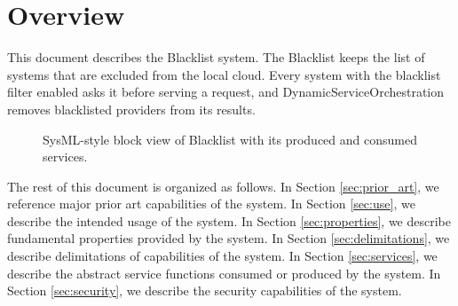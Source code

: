 \documentclass[a4paper]{arrowhead}
\begin{document}
\section{Overview}
\label{sec:overview}

This document describes the Blacklist system. The Blacklist keeps the list of systems that are excluded from the local cloud. Every system with the blacklist filter enabled asks it before serving a request, and Dynamic\allowbreak{}Service\allowbreak{}Orchestration removes blacklisted providers from its results.

\begin{figure}[ht!]
  \centering
  \caption{SysML-style block view of Blacklist with its produced and consumed services.}
  \label{fig:system}
\end{figure}

The rest of this document is organized as follows.
In Section \ref{sec:prior_art}, we reference major prior art capabilities of the system.
In Section \ref{sec:use}, we describe the intended usage of the system.
In Section \ref{sec:properties}, we describe fundamental properties provided by the system.
In Section \ref{sec:delimitations}, we describe delimitations of capabilities of the system.
In Section \ref{sec:services}, we describe the abstract service functions consumed or produced by the system.
In Section \ref{sec:security}, we describe the security capabilities of the system.
\end{document}
